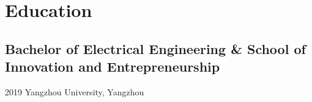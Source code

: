 \break

\section{Education}
\subsection{Bachelor of Electrical Engineering \& School of Innovation and Entrepreneurship}{}{2019}
Yangzhou University, Yangzhou

\vspace{0.1em}